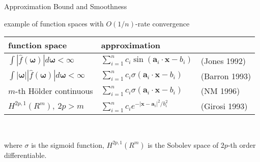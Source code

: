 \documentclass[fleqn,aspectratio=1610]{beamer}
\begin{document}
\begin{frame}[label={sec:orgcbee920}]{Approximation Bound and Smoothness}
\begin{center}
example of function spaces with \(O(1/n)\)-rate convergence 
\end{center}
\begin{center}
\small
\begin{tabular}[h]{lll}
  \hline
  function space
  & approximation & \\
  \hline
  \(\displaystyle\int|\hat{f}(\boldsymbol\omega)|d\boldsymbol\omega
  < \infty\)
  &\(\displaystyle %
    \sum_{i=1}^n c_i\sin(\boldsymbol{a}_i\cdot\boldsymbol{x}-b_i)\)
                  & (Jones 1992)\\
  \(\displaystyle\int|\boldsymbol\omega||\hat{f}(\boldsymbol\omega)|d\boldsymbol\omega
  < \infty\)
  &\(\displaystyle %
    \sum_{i=1}^n c_i\sigma(\boldsymbol{a}_i\cdot\boldsymbol{x}-b_i)\)
                  & (Barron 1993)\\
  \(m\)-th H\"older continuous
  &\(\displaystyle %
    \sum_{i=1}^n c_i\sigma(\boldsymbol{a}_i\cdot\boldsymbol{x}-b_i)\)
                  & (NM 1996)\\
  \(\displaystyle H^{2p,1}(R^m),\ 2p>m\)
  &\(\displaystyle %
    \sum_{i=1}^n c_i e^{-|\boldsymbol{x}-\boldsymbol{a}_i|^2/b_i^2}\)
                  & (Girosi 1993)\\
  \hline
\end{tabular}
\\[3pt]
\begin{minipage}[h]{.7\linewidth}
  where \(\sigma\) is the sigmoid function,
  \(H^{2p,1}(R^m)\) is the Sobolev space of
  \(2p\)-th order differentiable.
\end{minipage}
\end{center}
\nocite{Murata1996}
\end{frame}
\end{document}
